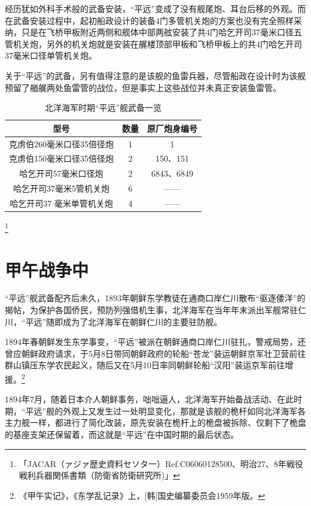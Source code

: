 \documentclass[12pt,UTF8]{ctexbook}
\begin{document}
经历犹如外科手术般的武备安装，“平远”变成了没有舰尾炮、耳台后移的外观。而在武备安装过程中，起初船政设计的装备4门多管机关炮的方案也没有完全照样采纳，只是在飞桥甲板附近两侧和舰体中部两舷安装了共4门哈乞开司37毫米口径五管机关炮，另外的机关炮就是安装在艉楼顶部甲板和飞桥甲板上的共4门哈乞开司37毫米口径单管机关炮。

关于“平远”的武备，另有值得注意的是该舰的鱼雷兵器，尽管船政在设计时为该舰预留了艏艉两处鱼雷管的战位，但是事实上这些战位并未真正安装鱼雷管。

\begin{table}[]
	\centering
	\label{tab:标签}
	\caption{北洋海军时期“平远”舰武备一览}
	\begin{tabular}{|c|c|c|}
		\hline
		型号 & 数量 & 原厂炮身编号 \\
		\hline
		克虏伯260毫米口径35倍径炮 & 1 & 1 \\
		\hline
		克虏伯150毫米口径35倍径炮 & 2 & 150、151 \\
		\hline
		哈乞开司57毫米口径炮 & 2 & 6843、6849 \\
		\hline
		哈乞开司37毫米5管机关炮 & 6 & —— \\
		\hline
		哈乞开司37 毫米单管机关炮 & 4 & —— \\
		\hline
	\end{tabular}
\end{table}

\footnote{「JACAR（ァジァ歴史資料セソタ一）Ref.C06060128500、明治27、8年戦役戦利兵器関係書類（防衛省防衛研究所)」}

\section{甲午战争中}

“平远”舰武备配齐后未久，1893年朝鲜东学教徒在通商口岸仁川散布“驱逐倭洋”的揭帖，为保护各国侨民，预防列强借机生事，北洋海军在当年年末派出军舰常驻仁川，“平远”随即成为了北洋海军在朝鲜仁川的主要驻防舰。

1894年春朝鲜发生东学事变，“平远”被派在朝鲜通商口岸仁川驻扎，警戒局势，还曾应朝鲜政府请求，于5月8日带同朝鲜政府的轮船“苍龙”装运朝鲜京军壮卫营前往群山镇压东学农民起义，随后又在5月10日率同朝鲜轮船“汉阳”装运京军前往增援。\footnote{《甲午实记》，《东学乱记录》上，[韩]国史编纂委员会1959年版。}

1894年7月，随着日本介人朝鲜事务，咄咄逼人，北洋海军开始备战活动、在此时期，“平远”舰的外观上又发生过一处明显变化，那就是该舰的桅杆如同北洋海军各主力舰一样，都进行了简化改装，原先安装在桅杆上的桅盘被拆除、仅剩下了桅盘的基座支架还保留着，而这就是“平远”在中国时期的最后状态。
\end{document}
